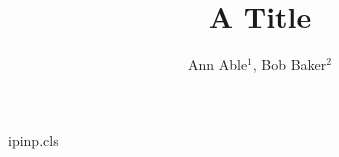 \begin{filecontents*}[overwrite]{ipinp.cls}
\renewcommand{\author}[1]{{\raggedright #1\par}}
\newcommand{\affil}[1]{{\small\raggedright #1\par}}
\end{filecontents*}
\documentclass{ipinp}

\title{A Title}
\author{Ann Able$^{1}$, Bob Baker$^{2}$}




\maketitle
Text.

